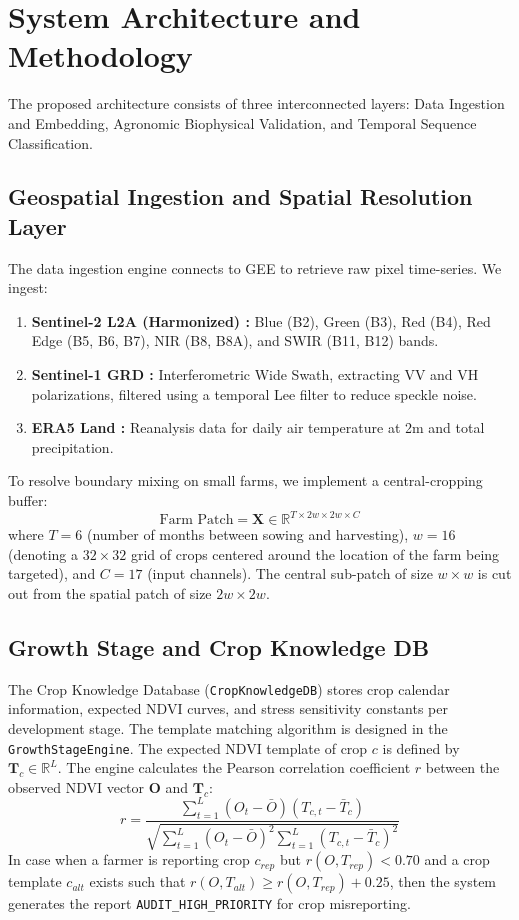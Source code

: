 \documentclass[conference]{IEEEtran}
\begin{document}
\section{System Architecture and Methodology}
The proposed architecture consists of three interconnected layers: Data Ingestion and Embedding, Agronomic Biophysical Validation, and Temporal Sequence Classification.

\subsection{Geospatial Ingestion and Spatial Resolution Layer}
The data ingestion engine connects to GEE to retrieve raw pixel time-series. We ingest:
\begin{enumerate}
\item \textbf{Sentinel-2 L2A (Harmonized) \cite{b6}:} Blue (B2), Green (B3), Red (B4), Red Edge (B5, B6, B7), NIR (B8, B8A), and SWIR (B11, B12) bands.
\item \textbf{Sentinel-1 GRD \cite{b6}:} Interferometric Wide Swath, extracting VV and VH polarizations, filtered using a temporal Lee filter to reduce speckle noise.
\item \textbf{ERA5 Land \cite{b7}:} Reanalysis data for daily air temperature at 2m and total precipitation.
\end{enumerate}

To resolve boundary mixing on small farms, we implement a central-cropping buffer:
\begin{equation}
\text{Farm Patch} = \mathbf{X} \in \mathbb{R}^{T \times 2w \times 2w \times C}
\end{equation}
where $T = 6$ (number of months between sowing and harvesting), $w = 16$ (denoting a $32 \times 32$ grid of crops centered around the location of the farm being targeted), and $C = 17$ (input channels). The central sub-patch of size $w \times w$ is cut out from the spatial patch of size $2w \times 2w$.

\subsection{Growth Stage and Crop Knowledge DB}
The Crop Knowledge Database (\texttt{CropKnowledgeDB}) stores crop calendar information, expected NDVI curves, and stress sensitivity constants per development stage. The template matching algorithm is designed in the \texttt{GrowthStageEngine}. The expected NDVI template of crop $c$ is defined by $\mathbf{T}_c \in \mathbb{R}^L$. The engine calculates the Pearson correlation coefficient $r$ between the observed NDVI vector $\mathbf{O}$ and $\mathbf{T}_c$:
\begin{equation}
r = \frac{\sum_{t=1}^L (O_t - \bar{O})(T_{c,t} - \bar{T}_c)}{\sqrt{\sum_{t=1}^L (O_t - \bar{O})^2 \sum_{t=1}^L (T_{c,t} - \bar{T}_c)^2}}
\end{equation}
In case when a farmer is reporting crop $c_{rep}$ but $r(O, T_{rep}) < 0.70$ and a crop template $c_{alt}$ exists such that $r(O, T_{alt}) \ge r(O, T_{rep}) + 0.25$, then the system generates the report \texttt{AUDIT\_HIGH\_PRIORITY} for crop misreporting.
\end{document}
